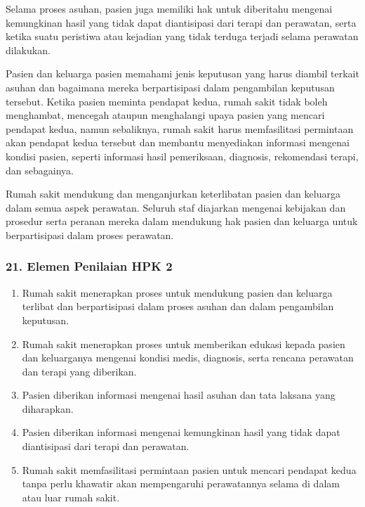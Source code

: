 \documentclass[
]{book}
\providecommand{\tightlist}{%
  \setlength{\itemsep}{0pt}\setlength{\parskip}{0pt}}
\begin{document}
Selama proses asuhan, pasien juga memiliki hak untuk diberitahu mengenai kemungkinan hasil yang tidak dapat diantisipasi dari terapi dan perawatan, serta ketika suatu peristiwa atau kejadian yang tidak terduga terjadi selama perawatan dilakukan.

Pasien dan keluarga pasien memahami jenis keputusan yang harus diambil terkait asuhan dan bagaimana mereka berpartisipasi dalam pengambilan keputusan tersebut. Ketika pasien meminta pendapat kedua, rumah sakit tidak boleh menghambat, mencegah ataupun menghalangi upaya pasien yang mencari pendapat kedua, namun sebaliknya, rumah sakit harus memfasilitasi permintaan akan pendapat kedua tersebut dan membantu menyediakan informasi mengenai kondisi pasien, seperti informasi hasil pemeriksaan, diagnosis, rekomendasi terapi, dan sebagainya.

Rumah sakit mendukung dan menganjurkan keterlibatan pasien dan keluarga dalam semua aspek perawatan. Seluruh staf diajarkan mengenai kebijakan dan prosedur serta peranan mereka dalam mendukung hak pasien dan keluarga untuk berpartisipasi dalam proses perawatan.

\hypertarget{elemen-penilaian-hpk-2}{%
\subsubsection*{21. Elemen Penilaian HPK 2}\label{elemen-penilaian-hpk-2}}

\begin{enumerate}
\def\labelenumi{\alph{enumi}.}
\tightlist
\item
  Rumah sakit menerapkan proses untuk mendukung pasien dan keluarga terlibat dan berpartisipasi dalam proses asuhan dan dalam pengambilan keputusan.
\item
  Rumah sakit menerapkan proses untuk memberikan edukasi kepada pasien dan keluarganya mengenai kondisi medis, diagnosis, serta rencana perawatan dan terapi yang diberikan.
\item
  Pasien diberikan informasi mengenai hasil asuhan dan tata laksana yang diharapkan.
\item
  Pasien diberikan informasi mengenai kemungkinan hasil yang tidak dapat diantisipasi dari terapi dan perawatan.
\item
  Rumah sakit memfasilitasi permintaan pasien untuk mencari pendapat kedua tanpa perlu khawatir akan mempengaruhi perawatannya selama di dalam atau luar rumah sakit.
\end{enumerate}
\end{document}
